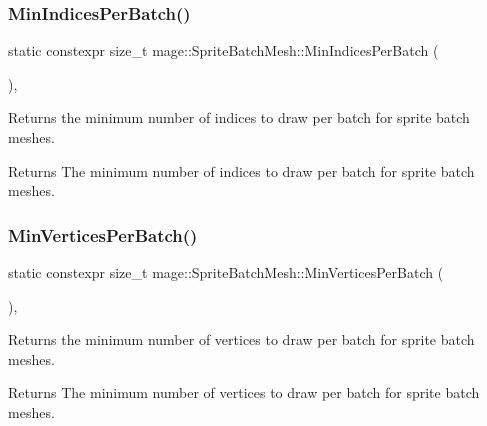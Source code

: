 \subsubsection{\texorpdfstring{Min\+Indices\+Per\+Batch()}{MinIndicesPerBatch()}}
{\footnotesize\ttfamily static constexpr size\+\_\+t mage\+::\+Sprite\+Batch\+Mesh\+::\+Min\+Indices\+Per\+Batch (\begin{DoxyParamCaption}{ }\end{DoxyParamCaption})\hspace{0.3cm}{\ttfamily [static]}, {\ttfamily [noexcept]}}

Returns the minimum number of indices to draw per batch for sprite batch meshes.

\begin{DoxyReturn}{Returns}
The minimum number of indices to draw per batch for sprite batch meshes. 
\end{DoxyReturn}
\hypertarget{classmage_1_1_sprite_batch_mesh_a489cec36c8cee8ece130b2c22597c711}{}\label{classmage_1_1_sprite_batch_mesh_a489cec36c8cee8ece130b2c22597c711} 
\subsubsection{\texorpdfstring{Min\+Vertices\+Per\+Batch()}{MinVerticesPerBatch()}}
{\footnotesize\ttfamily static constexpr size\+\_\+t mage\+::\+Sprite\+Batch\+Mesh\+::\+Min\+Vertices\+Per\+Batch (\begin{DoxyParamCaption}{ }\end{DoxyParamCaption})\hspace{0.3cm}{\ttfamily [static]}, {\ttfamily [noexcept]}}

Returns the minimum number of vertices to draw per batch for sprite batch meshes.

\begin{DoxyReturn}{Returns}
The minimum number of vertices to draw per batch for sprite batch meshes. 
\end{DoxyReturn}
\hypertarget{classmage_1_1_sprite_batch_mesh_ac6b9c2c79286f736d9a91a79cfa70044}{}\label{classmage_1_1_sprite_batch_mesh_ac6b9c2c79286f736d9a91a79cfa70044} 
